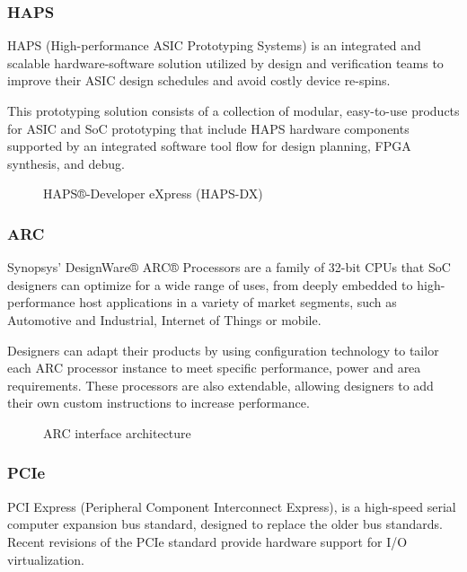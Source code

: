 \subsubsection{HAPS}\label{sc:haps}

HAPS (High-performance ASIC Prototyping Systems) is an integrated and scalable hardware-software solution utilized by design and verification teams to improve their ASIC design schedules and avoid costly device re-spins\cite{HAPS}.

This prototyping solution consists of a collection of modular, easy-to-use products for ASIC and SoC prototyping that include HAPS hardware components supported by an integrated software tool flow for design planning, FPGA synthesis, and debug.

  \begin{figure}[H]
  \centering
      \caption{HAPS®-Developer eXpress (HAPS-DX)}
      \label{fig:haps}
  \end{figure}

\subsubsection{ARC}\label{sc:arc}

Synopsys' DesignWare® ARC® Processors\cite{sns:ARC} are a family of 32-bit CPUs that SoC designers can optimize for a wide range of uses, from deeply embedded to high-performance host applications in a variety of market segments, such as Automotive and Industrial, Internet of Things or mobile. 

Designers can adapt their products by using configuration technology to tailor each ARC processor instance to meet specific performance, power and area requirements. These processors are also extendable, allowing designers to add their own custom instructions to increase performance.

  \begin{figure}[H]
  \centering
      \caption{ARC interface architecture}
     \label{fig:arc}
  \end{figure}


\subsubsection{PCIe}\label{sc:pcie}

PCI Express (Peripheral Component Interconnect Express), is a high-speed serial computer expansion bus standard, designed to replace the older bus standards\cite{wik:PCIE}\cite{sns:PCIE}.  Recent revisions of the PCIe standard provide hardware support for I/O virtualization.

